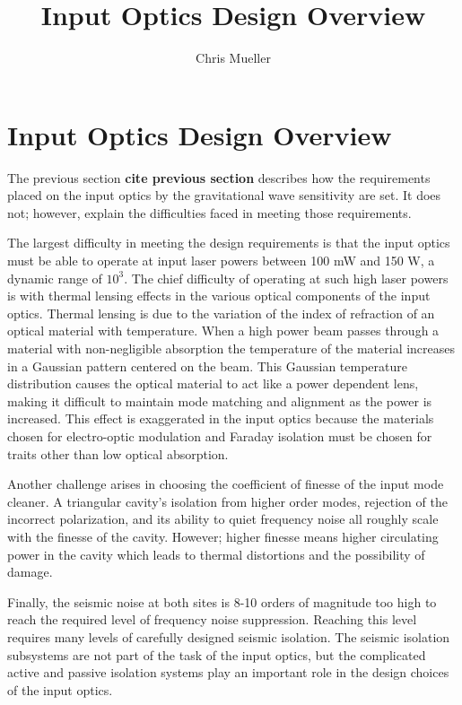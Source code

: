 \documentclass[10pt]{article}
\title{Input Optics Design Overview}
\author{Chris Mueller}
\begin{document}
\section{Input Optics Design Overview}

The previous section \textbf{cite previous section} describes how the requirements placed on the 
input optics by the gravitational wave sensitivity are set.  
It does not; however, explain the difficulties faced in meeting those requirements.  

The largest difficulty in meeting the design requirements is that the input optics 
must be able to operate at input laser powers between 100 mW and 150 W, 
a dynamic range of $10^3$.  
The chief difficulty of operating at such high laser powers is with thermal lensing 
effects in the various optical components of the input optics.  
Thermal lensing is due to the variation of the index of refraction of an optical 
material with temperature.  
When a high power beam passes through a material with non-negligible absorption 
the temperature of the material increases in a Gaussian pattern centered on the beam.  
This Gaussian temperature distribution causes the optical material to act like a power 
dependent lens, making it difficult to maintain mode matching and alignment as the power 
is increased.  
This effect is exaggerated in the input optics because the materials chosen for electro-optic 
modulation and Faraday isolation must be chosen for traits other than low optical absorption.

Another challenge arises in choosing the coefficient of finesse of the input mode cleaner.  
A triangular cavity's isolation from higher order modes, rejection of the incorrect polarization, 
and its ability to quiet frequency noise all roughly scale with the finesse of the cavity.  
However; higher finesse means higher circulating power in the cavity which leads to thermal 
distortions and the possibility of damage.  

Finally, the seismic noise at both sites is 8-10 orders of magnitude too high to reach 
the required level of frequency noise suppression.  
Reaching this level requires many levels of carefully designed seismic isolation.  
The seismic isolation subsystems are not part of the task of the input optics, but 
the complicated active and passive isolation systems play an important role in 
the design choices of the input optics.  
\end{document}
